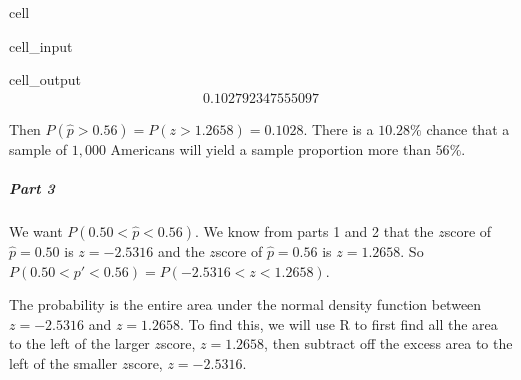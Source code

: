 \documentclass[letterpaper,10pt,english]{jupyterBook}
\begin{document}
\begin{sphinxuseclass}{cell}\begin{sphinxVerbatimInput}

\begin{sphinxuseclass}{cell_input}
\begin{sphinxVerbatim}[commandchars=\\\{\}]
\end{sphinxVerbatim}

\end{sphinxuseclass}\end{sphinxVerbatimInput}
\begin{sphinxVerbatimOutput}

\begin{sphinxuseclass}{cell_output}\begin{equation*}
\begin{split}0.102792347555097\end{split}
\end{equation*}
\end{sphinxuseclass}\end{sphinxVerbatimOutput}

\end{sphinxuseclass}
\sphinxAtStartPar
Then \(P(\hat{p} > 0.56) = P(z > 1.2658) = 0.1028\). There is a \(10.28\%\) chance that a sample of \(1{,}000\) Americans will yield a sample proportion more than \(56\%\).


\subparagraph{Part 3}
\label{\detokenize{Ch4 The Normal Distribution and the Central Limit Theorem/4.5 The Central Limit Theorem for Proportions:part-3}}
\sphinxAtStartPar
We want \(P(0.50 < \hat{p} < 0.56)\). We know from parts 1 and 2 that the \(z\)\sphinxhyphen{}score of \(\hat{p} = 0.50\) is \(z = -2.5316\) and the \(z\)\sphinxhyphen{}score of \(\hat{p} = 0.56\) is \(z = 1.2658\). So \(P(0.50 < p' < 0.56) = P(-2.5316 < z < 1.2658)\).

\sphinxAtStartPar
The probability is the entire area under the normal density function between \(z = -2.5316\) and \(z = 1.2658\). To find this, we will use R to first find all the area to the left of the larger \(z\)\sphinxhyphen{}score, \(z = 1.2658\), then subtract off the excess area to the left of the smaller \(z\)\sphinxhyphen{}score, \(z = -2.5316\).
\end{document}
